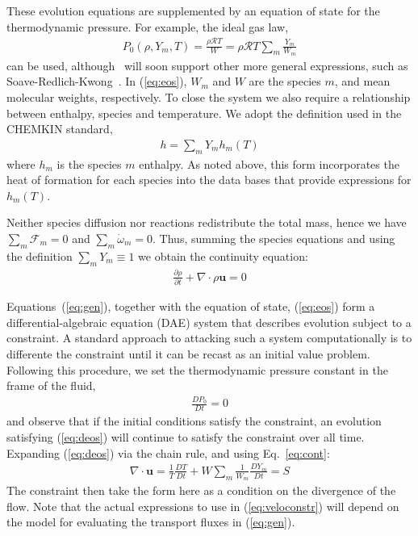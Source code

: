 These evolution equations are supplemented by an equation of state for the thermodynamic pressure.  For example, the ideal gas law,
\begin{eqnarray}
P_0(\rho,Y_m,T)=\frac{\rho \mathcal{R} T}{W}=\rho \mathcal{R} T \sum_m \frac{Y_m}{W_m}
\label{eq:eos}
\end{eqnarray}
can be used, although \pelelm\ will soon support other more general expressions, such as
Soave-Redlich-Kwong~\cite{Soave1972}.  In (\ref{eq:eos}), $W_m$ and $W$ are the species $m$, and mean
molecular weights, respectively.  To close the system
we also require a relationship between enthalpy, species and temperature.  We adopt the definition used in the CHEMKIN standard, 
\begin{eqnarray}
h=\sum_m Y_m h_m(T)
\end{eqnarray}
where $h_m$ is the species $m$ enthalpy.  As noted above, this form incorporates the heat of formation for each species into the data bases that provide expressions for $h_m(T)$.

Neither species diffusion nor reactions redistribute the total mass, hence we have $\sum_m \boldsymbol{\mathcal{F}}_m = 0$ and $\sum_m \dot{\omega}_m = 0$. Thus, summing the species equations and using the definition $\sum_m Y_m \equiv 1$ we obtain the continuity equation:
\begin{eqnarray}
\frac{\partial \rho}{\partial t} + \nabla \cdot \rho \boldsymbol{u} = 0
\label{eq:cont}
\end{eqnarray}

Equations~(\ref{eq:gen}), together with the equation of state, (\ref{eq:eos}) form a differential-algebraic equation (DAE) system that describes evolution subject to a constraint.  A standard approach to attacking such a system computationally is to differente the constraint until it can be recast as an initial value problem.  Following this procedure, we set the thermodynamic pressure constant in the frame of the fluid,
\begin{eqnarray}
\frac{DP_0}{Dt} = 0
\label{eq:deos}
\end{eqnarray}
and observe that if the initial conditions satisfy the constraint, an evolution satisfying (\ref{eq:deos}) 
will continue to satisfy the constraint over all time.  Expanding (\ref{eq:deos}) via the chain rule, and using
Eq.~\ref{eq:cont}:
\begin{eqnarray}
\nabla \cdot \boldsymbol{u} = \frac{1}{T}\frac{DT}{Dt} + W \sum_m \frac{1}{W_m} \frac{DY_m}{Dt} = S
\label{eq:veloconstr}
\end{eqnarray}
The constraint then take the form here as a condition on the divergence of the flow.  Note that the actual expressions to use in (\ref{eq:veloconstr}) will depend on the model for evaluating the transport fluxes in (\ref{eq:gen}).


